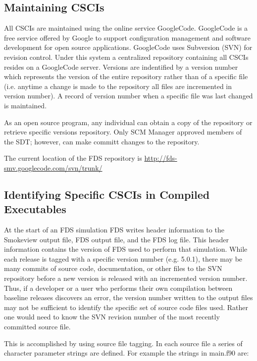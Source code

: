 \documentclass[11pt]{book}
\begin{document}
\subsection{Maintaining CSCIs}

All CSCIs are maintained using the online service GoogleCode.  GoogleCode is a free service offered by Google
to support configuration management and software development for open source applications.  GoogleCode uses 
Subversion (SVN) for revision control.  Under this system a centralized repository containing all CSCIs resides
on a GoogleCode server.  Versions are indentified by a version number which represents the version of the
entire repository rather than of a specific file (i.e. anytime a change is made to the repository all files are
incremented in version number).  A record of version number when a specific file was last changed is maintained.

As an open source program, any individual can obtain a copy of the repository or retrieve specific versions
repository.  Only SCM Manager approved members of the SDT; however, can make committ changes to the repository.

The current location of the FDS repository is \href{http://fds-smv.googlecode.com/svn/trunk/}
{{\ct http://fds-smv.googlecode.com/svn/trunk/}}

\subsection{Identifying Specific CSCIs in Compiled Executables}

At the start of an FDS simulation FDS writes header information to the Smokeview output file, FDS output file,
and the FDS log file.  This header information contains the version of FDS used to perform that simulation.
While each release is tagged with a specific version number (e.g. 5.0.1), there may be many commits of source
code, documentation, or other files to the SVN repository before a new version is released with an incremented
version number.  Thus, if a developer or a user who performs their own compilation between baseline releases
discovers an error, the version number written to the output files may not be sufficient to identify the
specific set of source code files used.  Rather one would need to know the SVN revision number of the most
recently committed source file.

This is accomplished by using source file tagging.  In each source file a series of character parameter
strings are defined.  For example the strings in main.f90 are:
\end{document}

